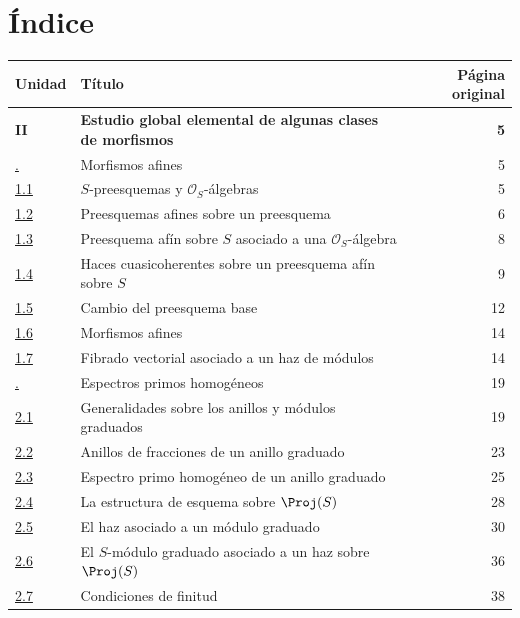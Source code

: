 \documentclass[oneside,10pt]{amsart}
\begin{document}
\section*{Índice}
\thispagestyle{plain}

\begingroup
\small
\renewcommand{\arraystretch}{1.04}
\begin{longtable}{@{}p{}p{}r@{}}
\textbf{Unidad} & \textbf{Título} & \textbf{Página original}\\
\hline
\textbf{II} & \textbf{Estudio global elemental de algunas clases de morfismos} & \textbf{5}\\
\hyperref[section:II.1-fr]{\textsection1.} & Morfismos afines & 5\\
\hyperref[subsection:II.1.1-fr]{1.1} & $S$-preesquemas y $\mathcal{O}_S$-álgebras & 5\\
\hyperref[subsection:II.1.2-fr]{1.2} & Preesquemas afines sobre un preesquema & 6\\
\hyperref[subsection:II.1.3-fr]{1.3} & Preesquema afín sobre $S$ asociado a una $\mathcal{O}_S$-álgebra & 8\\
\hyperref[subsection:II.1.4-fr]{1.4} & Haces cuasicoherentes sobre un preesquema afín sobre $S$ & 9\\
\hyperref[II.1.5-fr]{1.5} & Cambio del preesquema base & 12\\
\hyperref[II.1.6-fr]{1.6} & Morfismos afines & 14\\
\hyperref[II.1.7-fr]{1.7} & Fibrado vectorial asociado a un haz de módulos & 14\\
\hyperref[section:II.2-fr]{\textsection2.} & Espectros primos homogéneos & 19\\
\hyperref[subsection:II.2.1-fr]{2.1} & Generalidades sobre los anillos y módulos graduados & 19\\
\hyperref[subsection:II.2.2-fr]{2.2} & Anillos de fracciones de un anillo graduado & 23\\
\hyperref[subsection:II.2.3-fr]{2.3} & Espectro primo homogéneo de un anillo graduado & 25\\
\hyperref[subsection:II.2.4-fr]{2.4} & La estructura de esquema sobre $\Proj(S)$ & 28\\
\hyperref[subsection:II.2.5-fr]{2.5} & El haz asociado a un módulo graduado & 30\\
\hyperref[subsection:II.2.6-fr]{2.6} & El $S$-módulo graduado asociado a un haz sobre $\Proj(S)$ & 36\\
\hyperref[subsection:II.2.7-fr]{2.7} & Condiciones de finitud & 38\\

\end{longtable}
\end{document}
